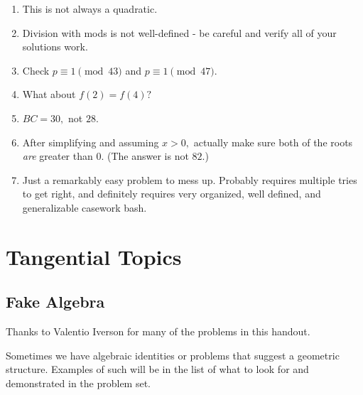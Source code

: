 \documentclass[blue,onecol]{shooting}
\begin{document}
\begin{enumerate}
    \item This is not always a quadratic.
    
    \item Division with mods is not well-defined - be careful and verify all of your solutions work.
    
    \item Check $p\equiv 1\pmod{43}$ and $p\equiv 1\pmod{47}.$
    
    \item What about $f(2)=f(4)?$
    
    \item $BC=30,$ not $28.$
    
    \item After simplifying and assuming $x>0,$ actually make sure both of the roots \textit{are} greater than $0.$ (The answer is not $82.$)
    
    \item Just a remarkably easy problem to mess up. Probably requires multiple tries to get right, and definitely requires very organized, well defined, and generalizable casework bash.
    
\end{enumerate}

\part{Tangential Topics}

\chapter{Fake Algebra}










Thanks to Valentio Iverson for many of the problems in this handout.

Sometimes we have algebraic identities or problems that suggest a geometric structure. Examples of such will be in the list of what to look for and demonstrated in the problem set.
\end{document}
